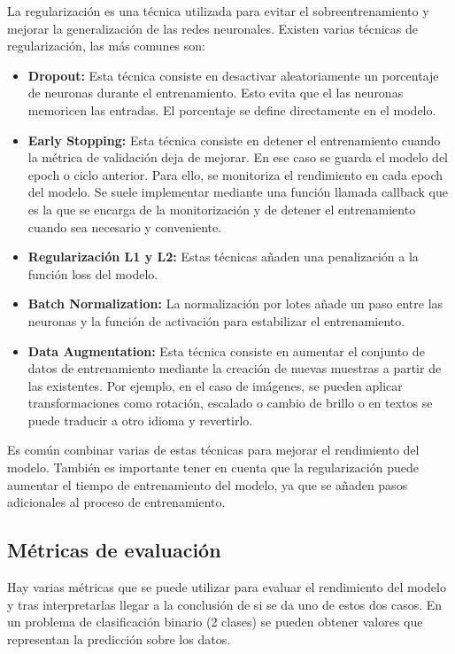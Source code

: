 La regularización es una técnica utilizada para evitar el sobreentrenamiento y mejorar la generalización de las redes neuronales.
Existen varias técnicas de regularización\cite{medium:regularizacion}, las más comunes son:
\begin{itemize}
	\item \textbf{Dropout:} Esta técnica consiste en desactivar aleatoriamente un porcentaje de neuronas durante el entrenamiento. Esto evita que el las neuronas memoricen las entradas. El porcentaje se define directamente en el modelo.
	\item \textbf{Early Stopping:} Esta técnica consiste en detener el entrenamiento cuando la métrica de validación deja de mejorar. En ese caso se guarda el modelo del epoch o ciclo anterior. Para ello, se monitoriza el rendimiento en cada epoch del modelo. Se suele implementar mediante una función llamada callback que es la que se encarga de la monitorización y de detener el entrenamiento cuando sea necesario y conveniente.
	\item \textbf{Regularización L1 y L2:} Estas técnicas añaden una penalización a la función loss del modelo.
	\item \textbf{Batch Normalization:} La normalización por lotes añade un paso entre las neuronas y la función de activación para estabilizar el entrenamiento.
	\item \textbf{Data Augmentation:} Esta técnica consiste en aumentar el conjunto de datos de entrenamiento mediante la creación de nuevas muestras a partir de las existentes. Por ejemplo, en el caso de imágenes, se pueden aplicar transformaciones como rotación, escalado o cambio de brillo o en textos se puede traducir a otro idioma y revertirlo.
\end{itemize}

Es común combinar varias de estas técnicas para mejorar el rendimiento del modelo. 
También es importante tener en cuenta que la regularización puede aumentar el tiempo de entrenamiento del modelo, ya que se añaden pasos adicionales al proceso de entrenamiento.

\subsection{Métricas de evaluación}

Hay varias métricas\cite{clasificacion} que se puede utilizar para evaluar el rendimiento del modelo y tras interpretarlas llegar a la conclusión de si se da uno de estos dos casos.
En un problema de clasificación binario (2 clases) se pueden obtener valores que representan la predicción sobre los datos.

